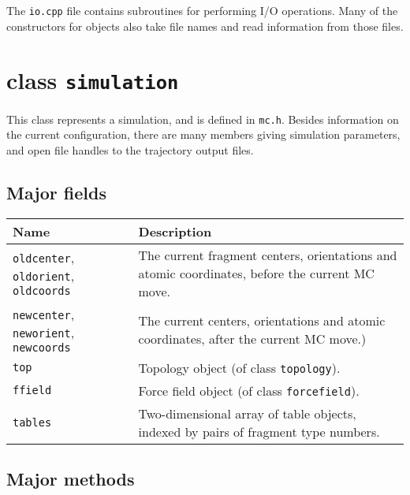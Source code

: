 \documentclass{article}      %
\begin{document}
The \verb+io.cpp+ file contains subroutines for performing I/O operations.  Many of the constructors for objects also take file names and read information from those files.  

\section{class \texttt{simulation}}
This class represents a simulation, and is defined in \verb+mc.h+.  Besides information on the current configuration, there are many members giving simulation parameters, and open file handles to the trajectory output files.

\subsection{Major fields}

\begin{tabular}{|p{8cm}|p{8cm}|}
\hline
Name &  Description \\
\hline
\verb+oldcenter+, \verb+oldorient+, \verb+oldcoords+ & The current fragment centers, orientations and atomic coordinates, before the current MC move. \\
\hline
\verb+newcenter+, \verb+neworient+, \verb+newcoords+ & The current centers, orientations and atomic coordinates, after the current MC move.) \\
\hline
\verb+top+ & Topology object (of class \verb+topology+). \\
\hline
\verb+ffield+ & Force field object (of class \verb+forcefield+). \\
\hline
\verb+tables+ & Two-dimensional array of table objects, indexed by pairs of fragment type numbers. \\
\hline
\end{tabular}

\subsection{Major methods}
\end{document}
